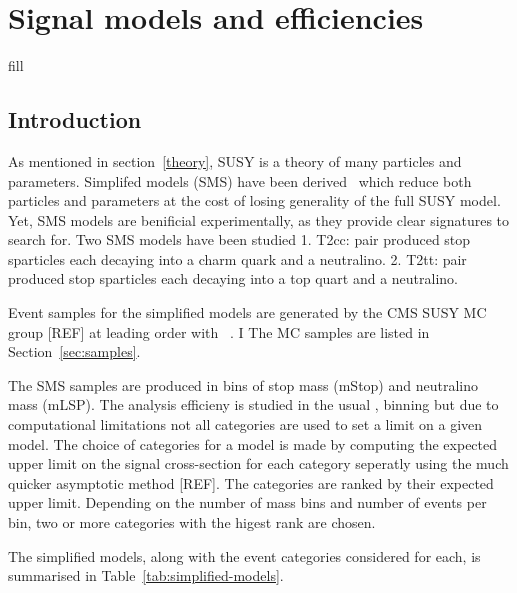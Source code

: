 \clearpage
\section{Signal models and efficiencies\label{sec:signal}}

fill 

\subsection{Introduction}

As mentioned in section~\ref{theory}, SUSY is a theory of many particles
and parameters.  Simplifed models (SMS) have been derived~\cite{Alwall:2008ag,Alwall:2008va,sms}
which reduce both particles and parameters at the cost of losing 
generality of the full SUSY model. Yet, SMS models are benificial experimentally,
as they provide clear signatures to search for.  Two SMS models have been studied
1. T2cc: pair produced stop sparticles each decaying into a charm quark and a neutralino.
2. T2tt: pair produced stop sparticles each decaying into a top quart and a neutralino.

Event samples for the simplified models are generated by the CMS SUSY MC group
[REF] at leading order with \MADGRAPH~\cite{madgraph}. I%
The MC samples are listed in Section~\ref{sec:samples}.

The SMS samples are produced in bins of stop mass (mStop) and neutralino
mass (mLSP). The analysis efficieny is studied in the usual \njet, \nb binning
but due to computational limitations not all categories are used to set 
a limit on a given model. The choice of categories for a model is made by
computing the expected upper limit on the signal cross-section for each
category seperatly using the much quicker asymptotic method [REF]. The categories
are ranked by their expected upper limit. Depending on the number of 
mass bins and number of events per bin, two or more categories with the 
higest rank are chosen.

The simplified models, along with the event categories considered for each,
is summarised in Table~\ref{tab:simplified-models}.


